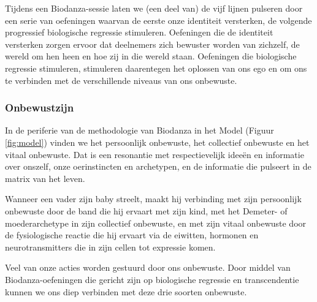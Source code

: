 \documentclass[
  11pt,
]{book}
\begin{document}
Tijdens een Biodanza-sessie laten we (een deel van) de vijf lijnen pulseren door een serie van oefeningen waarvan de eerste onze identiteit versterken, de volgende progressief biologische regressie stimuleren. Oefeningen die de identiteit versterken zorgen ervoor dat deelnemers zich bewuster worden van zichzelf, de wereld om hen heen en hoe zij in die wereld staan. Oefeningen die biologische regressie stimuleren, stimuleren daarentegen het oplossen van ons ego en om ons te verbinden met de verschillende niveaus van ons onbewuste.

\hypertarget{onbewustzijn}{%
\subsubsection{Onbewustzijn}\label{onbewustzijn}}

In de periferie van de methodologie van Biodanza in het Model (Figuur \ref{fig:model}) vinden we het persoonlijk onbewuste, het collectief onbewuste en het vitaal onbewuste. Dat is een resonantie met respectievelijk ideeën en informatie over onszelf, onze oerinstincten en archetypen, en de informatie die pulseert in de matrix van het leven.

Wanneer een vader zijn baby streelt, maakt hij verbinding met zijn persoonlijk onbewuste door de band die hij ervaart met zijn kind, met het Demeter- of moederarchetype in zijn collectief onbewuste, en met zijn vitaal onbewuste door de fysiologische reactie die hij ervaart via de eiwitten, hormonen en neurotransmitters die in zijn cellen tot expressie komen.

Veel van onze acties worden gestuurd door ons onbewuste. Door middel van Biodanza-oefeningen die gericht zijn op biologische regressie en transcendentie kunnen we ons diep verbinden met deze drie soorten onbewuste.
\end{document}
